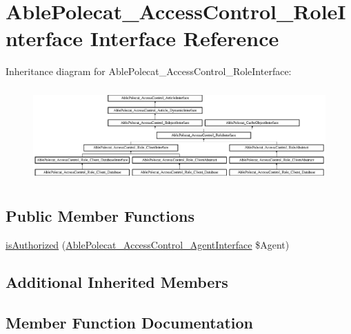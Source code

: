 \hypertarget{interface_able_polecat___access_control___role_interface}{}\section{Able\+Polecat\+\_\+\+Access\+Control\+\_\+\+Role\+Interface Interface Reference}
\label{interface_able_polecat___access_control___role_interface}
Inheritance diagram for Able\+Polecat\+\_\+\+Access\+Control\+\_\+\+Role\+Interface\+:\begin{figure}[H]
\begin{center}
\leavevmode
\includegraphics[height=3.639740cm]{interface_able_polecat___access_control___role_interface}
\end{center}
\end{figure}
\subsection*{Public Member Functions}
\begin{DoxyCompactItemize}
\item 
\hyperlink{interface_able_polecat___access_control___role_interface_a544353080f75dc923ef2448de56ce63d}{is\+Authorized} (\hyperlink{interface_able_polecat___access_control___agent_interface}{Able\+Polecat\+\_\+\+Access\+Control\+\_\+\+Agent\+Interface} \$Agent)
\end{DoxyCompactItemize}
\subsection*{Additional Inherited Members}


\subsection{Member Function Documentation}
\hypertarget{interface_able_polecat___access_control___role_interface_a544353080f75dc923ef2448de56ce63d}{}
